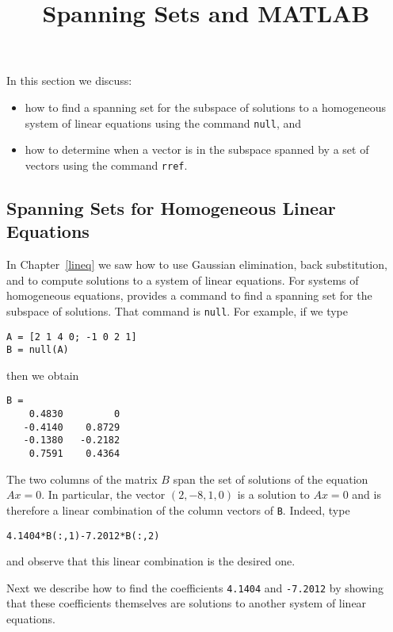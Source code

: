 \documentclass{ximera}
\title{Spanning Sets and MATLAB}
\begin{document}
\begin{abstract}
\end{abstract}
\maketitle

 \label{S:5.3}

In this section we discuss:
\begin{itemize}
\item	how to find a spanning set for the subspace of solutions to a
homogeneous system of linear equations using the \Matlab command {\tt null},
and
\item	how to determine when a vector is in the subspace spanned by a
set of vectors using the \Matlab command {\tt rref}.
\end{itemize}

\subsection*{Spanning Sets for Homogeneous Linear Equations}

In Chapter~\ref{lineq} we saw how to use Gaussian elimination,
back substitution, and \Matlab to compute solutions to a system
of linear equations.  For systems of
homogeneous equations, \Matlab
provides a command to find a spanning set for the subspace of solutions.
That command is {\tt null}.  For example, if we type
\begin{verbatim}
A = [2 1 4 0; -1 0 2 1]
B = null(A)
\end{verbatim} 
then we obtain
\begin{verbatim}
B =
    0.4830         0
   -0.4140    0.8729
   -0.1380   -0.2182
    0.7591    0.4364
\end{verbatim}
The two columns of the matrix $B$ span the set of solutions of
the equation $Ax=0$.  In particular, the vector $(2,-8,1,0)$ is a
solution to $Ax=0$ and is therefore a
linear combination  of the
column vectors of {\tt B}.  Indeed, type
\begin{verbatim}
4.1404*B(:,1)-7.2012*B(:,2)
\end{verbatim}
and observe that this linear combination is the desired one.

Next we describe how to find the coefficients {\tt 4.1404} and
{\tt -7.2012} by showing that these coefficients themselves are
solutions to another system of linear equations.
\end{document}
